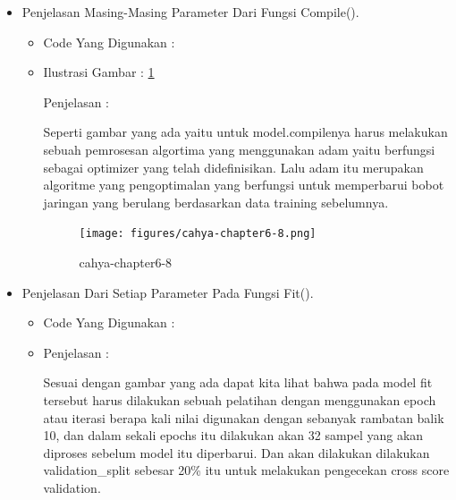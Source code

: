 \begin{enumerate}
\begin{itemize}
\par
\item Penjelasan Masing-Masing Parameter Dari Fungsi Compile().
\begin{itemize}
\item Code Yang Digunakan :
\par

\par
\par
\item Ilustrasi Gambar : \ref{cahya-chapter6-8}
\par
\par Penjelasan :
\par Seperti gambar yang ada yaitu untuk model.compilenya harus melakukan sebuah pemrosesan algortima yang menggunakan adam yaitu berfungsi sebagai optimizer yang telah didefinisikan. Lalu adam itu merupakan algoritme yang pengoptimalan yang berfungsi untuk memperbarui bobot jaringan yang berulang berdasarkan data training sebelumnya.
\par
\begin{figure}[!hbtp]
\centering
\texttt{[image: figures/cahya-chapter6-8.png]}
\caption{cahya-chapter6-8}
\label{cahya-chapter6-8}
\end{figure}
\par
\end{itemize}
\par
\par
\par
\par
\par
\par
\item Penjelasan Dari Setiap Parameter Pada Fungsi Fit().
\begin{itemize}
\item Code Yang Digunakan :
\par

\par
\item Penjelasan :
\par Sesuai dengan gambar yang ada dapat kita lihat bahwa pada model fit tersebut harus dilakukan sebuah pelatihan dengan menggunakan epoch atau iterasi berapa kali nilai digunakan dengan sebanyak rambatan balik 10, dan dalam sekali epochs itu dilakukan akan 32 sampel yang akan diproses sebelum model itu diperbarui. Dan akan dilakukan dilakukan validation\_split sebesar 20\% itu untuk melakukan pengecekan cross score validation.
\par

\end{itemize}
\end{itemize}
\end{enumerate}
